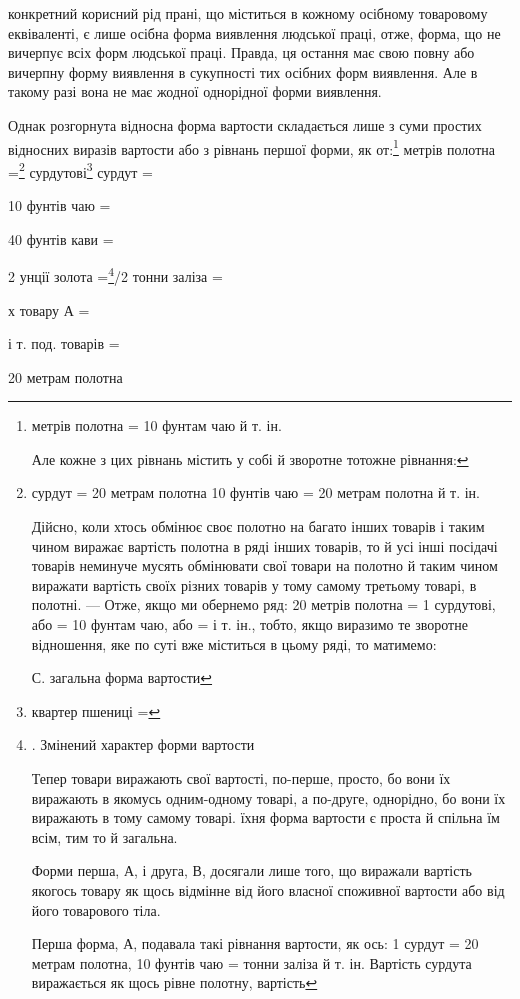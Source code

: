 \parcont{}  %
конкретний корисний рід прані, що міститься в кожному осібному
товаровому еквіваленті, є лише осібна форма виявлення людської
праці, отже, форма, що не вичерпує всіх форм людської праці.
Правда, ця остання має свою повну або вичерпну форму виявлення
в сукупності тих осібних форм виявлення. Але в такому разі вона
не має жодної однорідної форми виявлення.

Однак розгорнута відносна форма вартости складається лише
з суми простих відносних виразів вартости або з рівнань першої
форми, як от:\footnote{
метрів полотна = 10 фунтам чаю й т. ін.

Але кожне з цих рівнань містить у собі й зворотне тотожне
рівнання:
} метрів полотна =\footnote{
сурдут = 20 метрам полотна
10 фунтів чаю = 20 метрам полотна й т. ін.

Дійсно, коли хтось обмінює своє полотно на багато інших товарів
і таким чином виражає вартість полотна в ряді інших товарів,
то й усі інші посідачі товарів неминуче мусять обмінювати
свої товари на полотно й таким чином виражати вартість своїх
різних товарів у тому самому третьому товарі, в полотні. — Отже,
якщо ми обернемо ряд: 20 метрів полотна = 1 сурдутові, або =
10 фунтам чаю, або = і т. ін., тобто, якщо виразимо те зворотне
відношення, яке по суті вже міститься в цьому ряді, то матимемо:

С. загальна форма вартости
} сурдутові\footnote{
квартер пшениці =
} сурдут =

10 фунтів чаю =

40 фунтів кави =

2    унції золота =\footnote{
. Змінений характер форми вартости

Тепер товари виражають свої вартості, по-перше, просто, бо
вони їх виражають в якомусь одним-одному товарі, а по-друге,
однорідно, бо вони їх виражають в тому самому товарі. їхня форма
вартости є проста й спільна їм всім, тим то й загальна.

Форми перша, А, і друга, В, досягали лише того, що виражали
вартість якогось товару як щось відмінне від його власної
споживної вартости або від його товарового тіла.

Перша форма, А, подавала такі рівнання вартости, як ось: 1 сурдут
= 20 метрам полотна, 10 фунтів чаю =  тонни заліза й т. ін.
Вартість сурдута виражається як щось рівне полотну, вартість
}/2 тонни заліза =

х товару А =

і т. под. товарів =

20 метрам полотна
\parbreak{}  %
